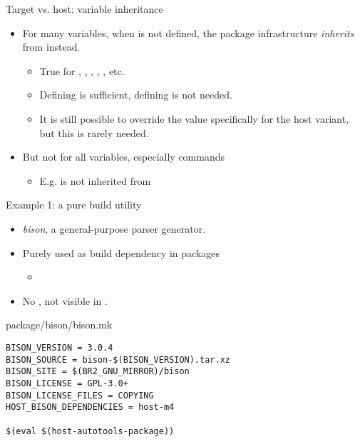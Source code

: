 \begin{frame}{Target vs. host: variable inheritance}
  \begin{itemize}
  \item For many variables, when  is not defined,
    the package infrastructure {\em inherits} from 
    instead.
    \begin{itemize}
    \item True for , ,
      , ,
      , etc.
    \item Defining  is sufficient, defining
       is not needed.
    \item It is still possible to override the value specifically for
      the host variant, but this is rarely needed.
    \end{itemize}
  \item But not for all variables, especially commands
    \begin{itemize}
    \item E.g.  is not inherited
      from 
    \end{itemize}
  \end{itemize}
\end{frame}

\begin{frame}[fragile]{Example 1: a pure build utility}
  \begin{itemize}
  \item {\em bison}, a general-purpose parser generator.
  \item Purely used as build dependency in packages
    \begin{itemize}
    \item {}
    \end{itemize}
  \item No , not visible in .
  \end{itemize}
  \begin{block}{package/bison/bison.mk}
    \begin{verbatim}
BISON_VERSION = 3.0.4
BISON_SOURCE = bison-$(BISON_VERSION).tar.xz
BISON_SITE = $(BR2_GNU_MIRROR)/bison
BISON_LICENSE = GPL-3.0+
BISON_LICENSE_FILES = COPYING
HOST_BISON_DEPENDENCIES = host-m4

$(eval $(host-autotools-package))
    \end{verbatim}
  \end{block}
\end{frame}

